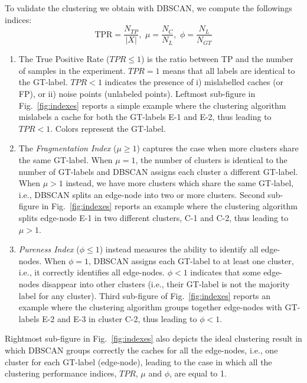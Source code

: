\documentclass{acm_proc_article-sp}
\newcommand{\node}{{edge-node}\xspace}
\newcommand{\nodes}{{edge-nodes}\xspace}
\begin{document}
To validate the clustering we obtain with DBSCAN, we compute the followings indices:
\begin{equation}
 \mbox{TPR} = \frac{N_{TP}}{|X|}, \,\,
 \mu = \frac{N_C}{N_{L}}, \,\,
 \phi = \frac{N_L}{N_{GT}}
\end{equation}\label{eq:tp_measure}
\begin{enumerate}
\item The True Positive Rate ($TPR\leq 1$) is the ratio between TP and the number of samples in the experiment.
$TPR=1$ means that all labels are identical to the GT-label. $TPR<1$ indicates the presence of i) mislabelled caches (or FP), or ii) noise points (unlabeled points). Leftmost sub-figure in Fig.~\ref{fig:indexes} reports a simple example where the clustering algorithm mislabels a cache for both the GT-labels E-1 and E-2, thus leading to $TPR < 1$. Colors represent the GT-label.

\item The \textit{Fragmentation Index} ($\mu\geq 1$) captures the case when more clusters share the same GT-label.
When $\mu=1$, the number of clusters is identical to the number of GT-labels and DBSCAN assigns each cluster a different GT-label. When $\mu>1$ instead, we have more clusters which share the same GT-label, i.e., DBSCAN splits an \node into two or more clusters. Second sub-figure in Fig.~\ref{fig:indexes} reports an example where the clustering algorithm splits \node E-1 in two different clusters, C-1 and C-2, thus leading to $\mu > 1$.

\item \textit{Pureness Index} ($\phi \leq 1$) instead measures the ability to
identify all edge-nodes. When $\phi = 1$, DBSCAN assigns each GT-label to at least one cluster, i.e., it correctly identifies all \nodes. $\phi < 1$ indicates that some \nodes disappear into other clusters (i.e., their GT-label is not the majority label for any cluster). Third sub-figure of Fig.~\ref{fig:indexes} reports an example where the clustering algorithm groups together \nodes with GT-labels E-2 and E-3 in cluster C-2, thus leading to $\phi < 1$.

\end{enumerate}

Rightmost sub-figure in Fig.~\ref{fig:indexes} also depicts the ideal clustering result in which DBSCAN groups correctly the caches for all the \nodes, i.e., one cluster for each GT-label (\node), leading to the case in which all the clustering performance indices, $TPR$, $\mu$ and $\phi$, are equal to 1.
\end{document}
